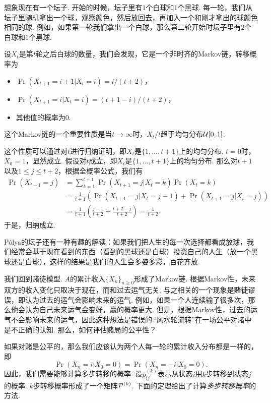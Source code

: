 \begin{example}[Pólya的坛子]
想象现在有一个坛子. 开始的时候，坛子里有$1$个白球和$1$个黑球. 每一轮，我们从坛子里随机拿出一个球，观察颜色，然后放回去，再加入一个和刚才拿出的球颜色相同的球. 例如，如果第一轮我们拿出一个白球，那么第二轮开始时坛子里有$2$个白球和$1$个黑球. 

设$X_t$是第$t$轮之后白球的数量，我们会发现，它是一个非时齐的Markov链，转移概率为
\begin{itemize}
    \item $\Pr(X_{t+1}=i+1|X_t=i)=i/(t+2)$，
    \item $\Pr(X_{t+1}=i|X_t=i)=(t+1-i)/(t+2)$，
    \item 其他值的概率为$0$. 
\end{itemize}
这个Markov链的一个重要性质是当$t\to\infty$时，$X_t/t$趋于均匀分布$\mathcal{U}[0,1]$. 

这个性质可以通过对$t$进行归纳证明，即$X_t$是$\{1,\dots,t+1\}$上的均匀分布. $t=0$时，$X_0=1$，显然成立. 假设对$t$成立，即$X_t$是$\{1,\dots,t+1\}$上的均匀分布. 那么对$t+1$以及$1\leq j\leq t+2$，根据全概率公式，我们有
\begin{align*}
    \Pr(X_{t+1}=j)&=\sum_{k=1}^{t+1}\Pr(X_{t+1}=j|X_t=k)\Pr(X_t=k)\\
    &=\frac{1}{t+1}(\Pr(X_{t+1}=j|X_t=j-1)+\Pr(X_{t+1}=j|X_t=j))\\
    &=\frac{1}{t+1}\left(\frac{j-1}{t+2}+\frac{t+2-j}{t+2}\right)=\frac{1}{t+2}.
\end{align*}
于是，归纳成立.

Pólya的坛子还有一种有趣的解读：如果我们把人生的每一次选择都看成放球，我们经常会基于现在看到的东西（看到的黑球还是白球）投资自己的人生（放一个黑球还是白球），这样的结果是我们的人生会多姿多彩，百花齐放. 
\end{example}

我们回到赌徒模型. $A$的累计收入$\{X_n\}_{n\geq 0}$形成了Markov链. 根据Markov性，未来双方的收入变化只取决于现在，而和过去运气无关. 与之相关的一个现象是赌徒谬误，即认为过去的运气会影响未来的运气. 例如，如果一个人连续输了很多次，那么他会认为自己未来运气会变好，赢的概率更大. 但是，根据Markov性，过去的运气不会影响未来的运气，因此这种想法是错误的.“风水轮流转”在一场公平对赌中是不正确的认知. 那么，如何评估赌局的公平性？

如果对赌是公平的，那么我们应该认为两个人每一轮的累计收入分布都是一样的，即
    \[\Pr(X_n=i|X_0=0)=\Pr(X_n=-i|X_0=0).\]
因此，我们需要能够计算多步转移的概率. 设$p_{ij}^{(k)}$表示从状态$i$用$k$步转移到状态$j$的概率. $k$步转移概率形成了一个矩阵$\mathcal P^{(k)}$. 下面的定理给出了计算\textit{多步转移概率}的方法.

